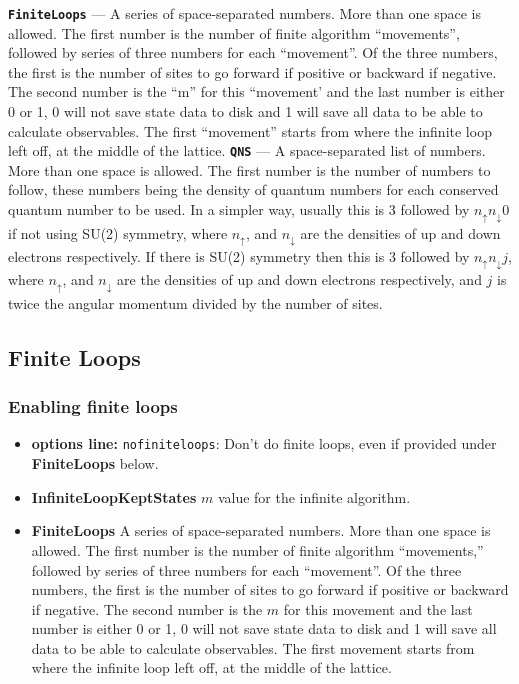 \documentclass[paper=letter]{scrartcl}
\newcommand{\inputItem}[1]{\noindent\texttt{\bf #1} ---}
\begin{document}
\inputItem{FiniteLoops} A series of space-separated numbers. More than one space is allowed. The first number is the number of finite algorithm ``movements'', followed by series of three numbers for each ``movement''. Of the three numbers, the first is the number of sites to go forward if positive or backward if negative. The second number is the ``m'' for this ``movement' and the last number is either 0 or 1, 0 will not save state data to disk and 1 will save all data to be able to calculate observables. The first ``movement'' starts from where the infinite loop left off, at the middle of the lattice. \inputItem{QNS} A space-separated list of numbers. More than one space is allowed. The first number is the number of numbers to follow, these numbers being the density of quantum numbers for each conserved quantum number to be used. In a simpler way, usually this is 3 followed by $n_\uparrow n_\downarrow 0$ if not using SU(2) symmetry, where $n_\uparrow$, and $n_\downarrow$ are the densities of up and down electrons respectively. If there is SU(2) symmetry then this is 3 followed by $n_\uparrow n_\downarrow j$, where $n_\uparrow$, and $n_\downarrow$ are the densities of up and down electrons respectively, and $j$ is twice the angular momentum divided by the number of sites.

\subsection{Finite Loops}

\subsubsection{Enabling finite loops} \begin{itemize} \item {\bf options line:} \verb=nofiniteloops=: Don't do finite loops, even if provided under {\bf FiniteLoops} below. \item {\bf InfiniteLoopKeptStates} $m$ value for the infinite algorithm. \item {\bf FiniteLoops} A series of space-separated numbers. More than one space is allowed. The first number is the number of finite algorithm ``movements,'' followed by series of three numbers for each ``movement''. Of the three numbers, the first is the number of sites to go forward if positive or backward if negative. The second number is the $m$ for this movement and the last number is either 0 or 1, 0 will not save state data to disk and 1 will save all data to be able to calculate observables. The first movement starts from where the infinite loop left off, at the middle of the lattice. \end{itemize}
\end{document}
